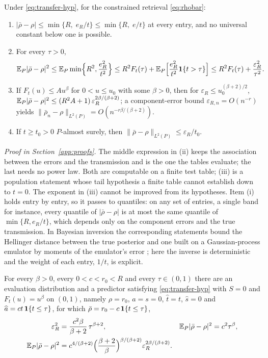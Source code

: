 \begin{theorem}\label{thm:transfer}
Under \eqref{eq:transfer-hyp}, for the constrained retrieval \eqref{eq:rhobar}:
\begin{enumerate}
\item $|\bar\rho-\rho|\le\min\{R,\;e_R/t\}\le\min\{R,\;e/t\}$ at every entry, and no universal constant below one
is possible.
\item For every $\tau>0$,
\[
\mathbb{E}_P|\bar\rho-\rho|^2\le\mathbb{E}_P\min\Bigl\{R^2,\frac{e_R^2}{t^2}\Bigr\}
\le R^2F_t(\tau)+\mathbb{E}_P\Bigl[\frac{e_R^2}{t^2}\mathbf{1}\{t>\tau\}\Bigr]
\le R^2F_t(\tau)+\frac{\varepsilon_R^2}{\tau^2}.
\]
\item If $F_t(u)\le Au^\beta$ for $0<u\le u_0$ with some $\beta>0$, then for
$\varepsilon_R\le u_0^{(\beta+2)/2}$,
$\mathbb{E}_P|\bar\rho-\rho|^2\le(R^2A+1)\,\varepsilon_R^{2\beta/(\beta+2)}$; a component-error bound
$\varepsilon_{R,n}=O(n^{-r})$ yields $\|\bar\rho_n-\rho\|_{L^2(P)}=O(n^{-r\beta/(\beta+2)})$.
\item If $t\ge t_0>0$ $P$-almost surely, then $\|\bar\rho-\rho\|_{L^2(P)}\le\varepsilon_R/t_0$.
\end{enumerate}
\end{theorem}

\noindent\emph{Proof in Section~\ref{app:proofs}.}
The middle expression in (ii) keeps the association between the errors and the transmission and is the one the
tables evaluate; the last needs no power law. Both are computable on a finite test table; (iii) is a population
statement whose tail hypothesis a finite table cannot establish down to $t=0$. The exponent in (iii) cannot be
improved from its hypotheses. Item (i) holds entry by entry, so it passes to quantiles: on any set of entries, a
single band for instance, every quantile of $|\bar\rho-\rho|$ is at most the same quantile of $\min\{R,e_R/t\}$,
which depends only on the component errors and the true transmission. In Bayesian inversion the corresponding
statements bound the Hellinger distance between the true posterior and one built on a Gaussian-process emulator by
moments of the emulator's error \cite{stuartteckentrup}; here the inverse is deterministic and the weight of each
entry, $1/t$, is explicit.

\begin{proposition}\label{prop:attained}
For every $\beta>0$, every $0<c<r_0<R$ and every $\tau\in(0,1)$ there are an evaluation distribution and a predictor
satisfying \eqref{eq:transfer-hyp} with $S=0$ and $F_t(u)=u^\beta$ on $(0,1)$, namely $\rho=r_0$, $a=s=0$,
$\widehat t=t$, $\widehat s=0$ and $\widehat a=ct\,\mathbf{1}\{t\le\tau\}$, for which $\bar\rho=r_0-c\,\mathbf{1}\{t\le\tau\}$,
\[
\begin{aligned}
\varepsilon_R^2&=\frac{c^2\beta}{\beta+2}\,\tau^{\beta+2},
&\mathbb{E}_P|\bar\rho-\rho|^2&=c^2\tau^\beta,\\
\mathbb{E}_P|\bar\rho-\rho|^2
&=c^{4/(\beta+2)}\Bigl(\frac{\beta+2}{\beta}\Bigr)^{\beta/(\beta+2)}
\varepsilon_R^{2\beta/(\beta+2)} .
\end{aligned}
\]
\end{proposition}

